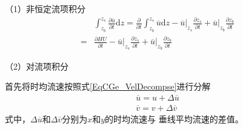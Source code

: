 （1）非恒定流项积分
\begin{equation}
  \begin{aligned}
    &
    \int_{z_{b}}^{ z_{s}}\!
    \frac{\partial \overline{u}}{\partial t}
    \mathrm{d}z
    =
    \frac{\partial}{\partial t}
    \int_{z_{b}}^{ z_{s}}\!
    \overline{u}
    \mathrm{d}z
    -
    \left.\overline{u}\right|_{z_{s}}\frac{\partial  z_{s}}{\partial t}
    +
    \left.\overline{u}\right|_{z_{b}}\frac{\partial z_{b}}{\partial t}
    \\
    =&
    \frac{\partial HU}{\partial t}
    -
    \left.\overline{u}\right|_{z_{s}}\frac{\partial  z_{s}}{\partial t}
    +
    \left.\overline{u}\right|_{z_{b}}\frac{\partial z_{b}}{\partial t}
  \end{aligned}
  \label{EqCGe_Mex_US_Int}
\end{equation}

（2）对流项积分

首先将时均流速按照式\eqref{EqCGe_VelDecompse}进行分解
\begin{equation}
  \begin{aligned}
    \overline{u}
    =
    u+\Delta\overline{u}
    \\
    \overline{v}
    =
    v+\Delta\overline{v}
  \end{aligned}
  \label{EqCGe_VelDecompse}
\end{equation}
式中，$\Delta\overline{u}$和$\Delta\overline{v}$分别为$x$和$y$的时均流速与
垂线平均流速的差值。

